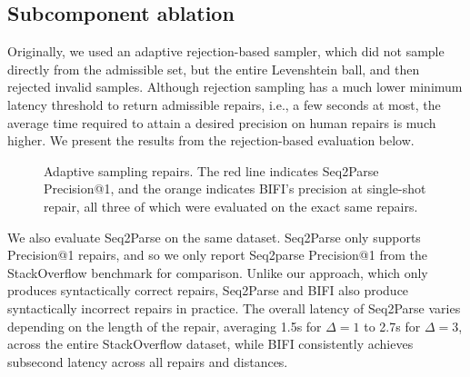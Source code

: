 \documentclass[runningheads]{llncs}
\begin{document}

  \subsection{Subcomponent ablation}\label{sec:rq3}

  Originally, we used an adaptive rejection-based sampler, which did not sample directly from the admissible set, but the entire Levenshtein ball, and then rejected invalid samples. Although rejection sampling has a much lower minimum latency threshold to return admissible repairs, i.e., a few seconds at most, the average time required to attain a desired precision on human repairs is much higher. We present the results from the rejection-based evaluation below.

  \begin{figure}[H]
    \resizebox{.24\textwidth}{!}{}
    \resizebox{.25\textwidth}{!}{}
    \resizebox{.24\textwidth}{!}{}
    \resizebox{.24\textwidth}{!}{}
    \caption{Adaptive sampling repairs. The red line indicates Seq2Parse Precision@1, and the orange indicates BIFI's precision at single-shot repair, all three of which were evaluated on the exact same repairs.}\label{fig:adaptive}
  \end{figure}

  We also evaluate Seq2Parse on the same dataset. Seq2Parse only supports Precision@1 repairs, and so we only report Seq2parse Precision@1 from the StackOverflow benchmark for comparison. Unlike our approach, which only produces syntactically correct repairs, Seq2Parse and BIFI also produce syntactically incorrect repairs in practice. The overall latency of Seq2Parse varies depending on the length of the repair, averaging 1.5s for $\Delta=1$ to 2.7s for $\Delta=3$, across the entire StackOverflow dataset, while BIFI consistently achieves subsecond latency across all repairs and distances.
\end{document}
